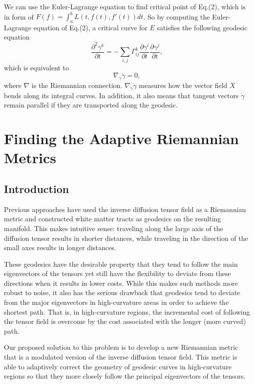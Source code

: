 \documentclass{article}
\theoremstyle{definition}
\theoremstyle{plain}
\begin{document}
We can use the Euler-Lagrange equation to find critical point of Eq.(2), which is in form of $F(f)=\int^b_aL(t,f(t),f'(t))dt$. So by computing the Euler-Lagrange equation of Eq.(2), a critical curve for $E$ satisfies the following geodesic equation
\begin{equation*}
    \frac{\partial^2\gamma^k}{\partial t}=-\sum_{i,j}\Gamma^k_{ij}\frac{\partial\gamma^i}{\partial t}\frac{\partial\gamma^j}{\partial t},
\end{equation*}
which is equivalent to 
\begin{equation*}
    \nabla_{\Dot{\gamma}}\Dot{\gamma}=0,    
\end{equation*}
where $\nabla$ is the Riemannian connection. $\nabla_{\Dot{\gamma}}\Dot{\gamma}$ measures how the vector field $X$ bends along its integral curves. In addition, it also means that tangent vectors $\Dot{\gamma}$ remain parallel if they are transported along the geodesic.

\section{Finding the Adaptive Riemannian Metrics}
\subsection{Introduction}
Previous approaches have used the inverse diffusion tensor field as a Riemannian metric and constructed white matter tracts as geodesics on
the resulting manifold. This makes intuitive sense: traveling along the large axis of the diffusion tensor results in shorter distances, while traveling in the direction of the small axes results in longer distances.

These geodesics have the desirable property that they tend to follow the main eigenvectors of the tensors yet still have the flexibility to deviate from these directions when it results in lower costs. While this makes such methods more robust to noise, it also has the serious drawback that geodesics tend to deviate from the major eigenvectors in high-curvature areas in order to achieve the shortest path. That is, in high-curvature regions, the incremental cost of following the tensor field is overcome by the cost associated with the longer (more curved) path.

Our proposed solution to this problem is to develop a new Riemannian metric that is a modulated version of the inverse diffusion tensor field. This metric is able to adaptively correct the geometry of geodesic curves in high-curvature regions so that they more closely follow the principal eigenvectors of the tensors.
\end{document}
